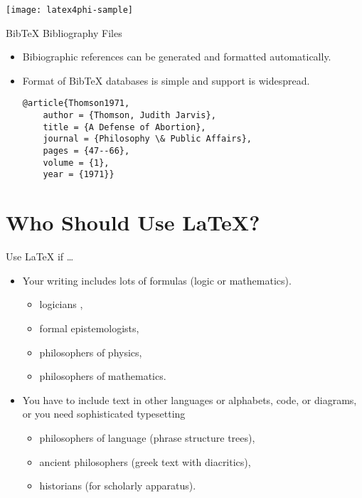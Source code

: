 \begin{frame}

\texttt{[image: latex4phi-sample]}
\end{frame}

\begin{frame}[fragile]{Bib\TeX{} Bibliography Files}

\begin{itemize}
\item Bibiographic references can be generated and formatted automatically.
\item Format of Bib\TeX{} databases is simple and support is widespread.
\begin{verbatim}
@article{Thomson1971,
    author = {Thomson, Judith Jarvis},
    title = {A Defense of Abortion},
    journal = {Philosophy \& Public Affairs},
    pages = {47--66},
    volume = {1},
    year = {1971}}
\end{verbatim}
\end{itemize}
\end{frame}

\section{Who Should Use \LaTeX{}?}


\begin{frame}{Use \LaTeX{} if \dots }

\begin{itemize}
\item Your writing includes lots of formulas (logic or mathematics). 
  \begin{itemize}
  \item logicians ,
  \item formal epistemologists,
  \item philosophers of physics,
  \item philosophers of mathematics.
  \end{itemize}

\item You have to include text in other languages or alphabets, code,
or diagrams, or you need sophisticated typesetting 
\begin{itemize}
\item philosophers of language (phrase structure trees),
\item ancient philosophers (greek text with diacritics),
\item historians (for scholarly apparatus).
\end{itemize}

\end{itemize}

\end{frame}

